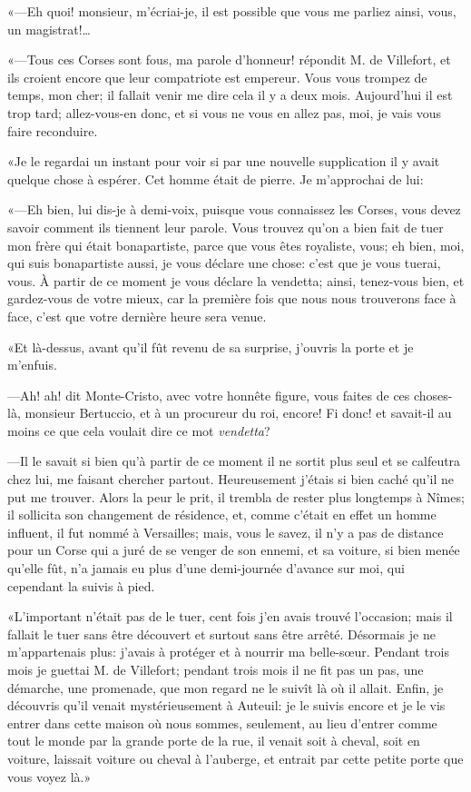 «—Eh quoi! monsieur, m'écriai-je, il est possible que vous me parliez ainsi, vous, un magistrat!\dots 

«—Tous ces Corses sont fous, ma parole d'honneur! répondit M. de Villefort, et ils croient encore que leur compatriote est empereur. Vous vous trompez de temps, mon cher; il fallait venir me dire cela il y a deux mois. Aujourd'hui il est trop tard; allez-vous-en donc, et si vous ne vous en allez pas, moi, je vais vous faire reconduire. 

«Je le regardai un instant pour voir si par une nouvelle supplication il y avait quelque chose à espérer. Cet homme était de pierre. Je m'approchai de lui: 

«—Eh bien, lui dis-je à demi-voix, puisque vous connaissez les Corses, vous devez savoir comment ils tiennent leur parole. Vous trouvez qu'on a bien fait de tuer mon frère qui était bonapartiste, parce que vous êtes royaliste, vous; eh bien, moi, qui suis bonapartiste aussi, je vous déclare une chose: c'est que je vous tuerai, vous. À partir de ce moment je vous déclare la vendetta; ainsi, tenez-vous bien, et gardez-vous de votre mieux, car la première fois que nous nous trouverons face à face, c'est que votre dernière heure sera venue. 

«Et là-dessus, avant qu'il fût revenu de sa surprise, j'ouvris la porte et je m'enfuis. 

—Ah! ah! dit Monte-Cristo, avec votre honnête figure, vous faites de ces choses-là, monsieur Bertuccio, et à un procureur du roi, encore! Fi donc! et savait-il au moins ce que cela voulait dire ce mot \textit{vendetta}? 

—Il le savait si bien qu'à partir de ce moment il ne sortit plus seul et se calfeutra chez lui, me faisant chercher partout. Heureusement j'étais si bien caché qu'il ne put me trouver. Alors la peur le prit, il trembla de rester plus longtemps à Nîmes; il sollicita son changement de résidence, et, comme c'était en effet un homme influent, il fut nommé à Versailles; mais, vous le savez, il n'y a pas de distance pour un Corse qui a juré de se venger de son ennemi, et sa voiture, si bien menée qu'elle fût, n'a jamais eu plus d'une demi-journée d'avance sur moi, qui cependant la suivis à pied. 

«L'important n'était pas de le tuer, cent fois j'en avais trouvé l'occasion; mais il fallait le tuer sans être découvert et surtout sans être arrêté. Désormais je ne m'appartenais plus: j'avais à protéger et à nourrir ma belle-sœur. Pendant trois mois je guettai M. de Villefort; pendant trois mois il ne fit pas un pas, une démarche, une promenade, que mon regard ne le suivît là où il allait. Enfin, je découvris qu'il venait mystérieusement à Auteuil: je le suivis encore et je le vis entrer dans cette maison où nous sommes, seulement, au lieu d'entrer comme tout le monde par la grande porte de la rue, il venait soit à cheval, soit en voiture, laissait voiture ou cheval à l'auberge, et entrait par cette petite porte que vous voyez là.» 

